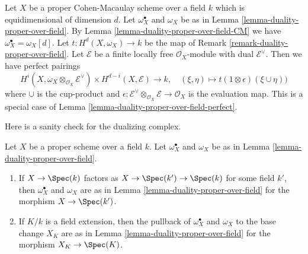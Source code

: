 \begin{remark}
\label{remark-rework-duality-locally-free-CM}
Let $X$ be a proper Cohen-Macaulay scheme over a field $k$
which is equidimensional of dimension $d$.
Let $\omega_X^\bullet$ and $\omega_X$ be as in
Lemma \ref{lemma-duality-proper-over-field}.
By Lemma \ref{lemma-duality-proper-over-field-CM}
we have $\omega_X^\bullet = \omega_X[d]$.
Let $t : H^d(X, \omega_X) \to k$ be the map of
Remark \ref{remark-duality-proper-over-field}.
Let $\mathcal{E}$ be a finite locally free $\mathcal{O}_X$-module
with dual $\mathcal{E}^\vee$. Then we have perfect pairings
$$
H^i(X, \omega_X \otimes_{\mathcal{O}_X} \mathcal{E}^\vee)
\times
H^{d - i}(X, \mathcal{E})
\longrightarrow
k,\quad
(\xi, \eta) \longmapsto t(1 \otimes \epsilon)(\xi \cup \eta))
$$
where $\cup$ is the cup-product and
$\epsilon : \mathcal{E}^\vee \otimes_{\mathcal{O}_X} \mathcal{E}
\to \mathcal{O}_X$ is the evaluation map.
This is a special case of Lemma \ref{lemma-duality-proper-over-field-perfect}.
\end{remark}

\noindent
Here is a sanity check for the dualizing complex.

\begin{lemma}
\label{lemma-sanity-check-duality}
Let $X$ be a proper scheme over a field $k$. Let $\omega_X^\bullet$ and
$\omega_X$ be as in Lemma \ref{lemma-duality-proper-over-field}.
\begin{enumerate}
\item If $X \to \Spec(k)$ factors as $X \to \Spec(k') \to \Spec(k)$
for some field $k'$, then $\omega_X^\bullet$ and $\omega_X$
are as in Lemma \ref{lemma-duality-proper-over-field} for the morphism
$X \to \Spec(k')$.
\item If $K/k$ is a field extension, then the pullback of
$\omega_X^\bullet$ and $\omega_X$ to the base change $X_K$
are as in  Lemma \ref{lemma-duality-proper-over-field} for the morphism
$X_K \to \Spec(K)$.
\end{enumerate}
\end{lemma}

